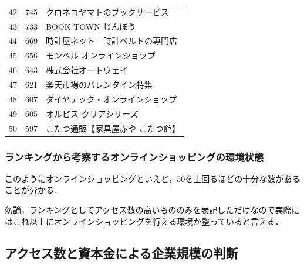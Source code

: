 \begin{table}[htb]
\begin{center}
\begin{tabular}{|r|r|p{30em}|}
	\parbox[c][\myranking][c]{0cm}{}
	42 & 745 &クロネコヤマトのブックサービス \\

	\parbox[c][\myranking][c]{0cm}{}
	43 & 733 & BOOK TOWN じんぼう \\

	\parbox[c][\myranking][c]{0cm}{}
	44 & 669 & 時計屋ネット - 時計ベルトの専門店 \\

	\parbox[c][\myranking][c]{0cm}{}
	45 & 656 & モンベル オンラインショップ  \\
	\hline
	\parbox[c][\myranking][c]{0cm}{}
	46 & 643 & 株式会社オートウェイ \\

	\parbox[c][\myranking][c]{0cm}{}
	47 & 621 & 楽天市場のバレンタイン特集 \\

	\parbox[c][\myranking][c]{0cm}{}
	48 & 607 & ダイヤテック・オンラインショップ \\

	\parbox[c][\myranking][c]{0cm}{}
	49 & 605 & オルビス クリアシリーズ \\

	\parbox[c][\myranking][c]{0cm}{}
	50 & 597 &こたつ通販【家具屋赤や こたつ館】 \\
	\hline


	\end{tabular}
  \end{center}
 


\end{table}


\subsubsection{ランキングから考察するオンラインショッピングの環境状態}

このようにオンラインショッピングといえど，50を上回るほどの十分な数があることが分かる．

勿論，ランキングとしてアクセス数の高いもののみを表記しただけなので実際にはこれ以上にオンラインショッピングを行える環境が整っていると言える．






\newpage






\subsection{アクセス数と資本金による企業規模の判断}


